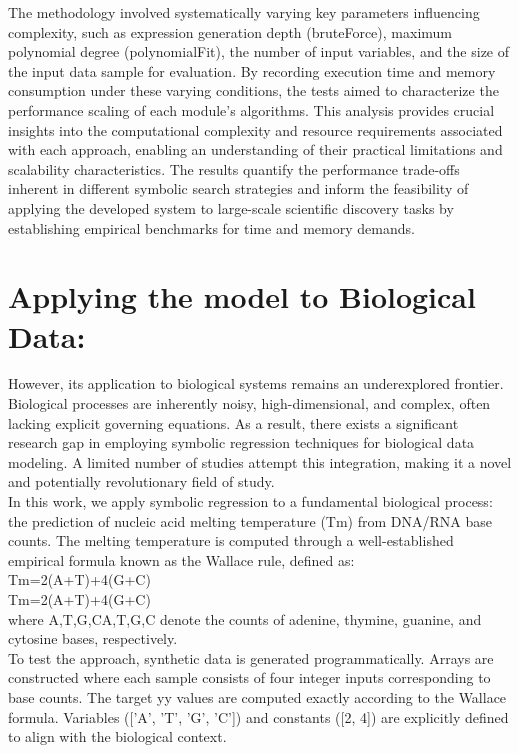 \documentclass{article}
\begin{document}
The methodology involved systematically varying key parameters influencing complexity, such as expression generation depth (bruteForce), maximum polynomial degree (polynomialFit), the number of input variables, and the size of the input data sample for evaluation. By recording execution time and memory consumption under these varying conditions, the tests aimed to characterize the performance scaling of each module's algorithms. This analysis provides crucial insights into the computational complexity and resource requirements associated with each approach, enabling an understanding of their practical limitations and scalability characteristics. The results quantify the performance trade-offs inherent in different symbolic search strategies and inform the feasibility of applying the developed system to large-scale scientific discovery tasks by establishing empirical benchmarks for time and memory demands.\\




\section{ Applying the model to Biological Data: }

However, its application to biological systems remains an underexplored frontier. Biological processes are inherently noisy, high-dimensional, and complex, often lacking explicit governing equations. As a result, there exists a significant research gap in employing symbolic regression techniques \cite{willard2022}for biological data modeling. A limited number of studies attempt this integration, making it a novel and potentially revolutionary field of study.\\

In this work, we apply symbolic regression to a fundamental biological process: the prediction of nucleic acid melting temperature (Tm) from DNA/RNA base counts. The melting temperature is computed through a well-established empirical formula known as the Wallace rule, defined as:\\
Tm=2(A+T)+4(G+C)\\
Tm=2(A+T)+4(G+C)\\

where A,T,G,CA,T,G,C denote the counts of adenine, thymine, guanine, and cytosine bases, respectively.\\

To test the approach, synthetic data is generated programmatically. Arrays are constructed where each sample consists of four integer inputs corresponding to base counts. The target yy values are computed exactly according to the Wallace formula. Variables (['A', 'T', 'G', 'C']) and constants ([2, 4]) are explicitly defined to align with the biological context.\\
\end{document}
